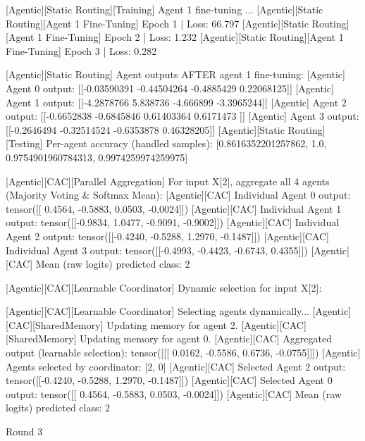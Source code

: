 [Agentic][Static Routing][Training] Agent 1 fine-tuning ...
[Agentic][Static Routing][Agent 1 Fine-Tuning] Epoch 1 | Loss: 66.797
[Agentic][Static Routing][Agent 1 Fine-Tuning] Epoch 2 | Loss: 1.232
[Agentic][Static Routing][Agent 1 Fine-Tuning] Epoch 3 | Loss: 0.282

[Agentic][Static Routing] Agent outputs AFTER agent 1 fine-tuning:
[Agentic] Agent 0 output: [[-0.03590391 -0.44504264 -0.4885429   0.22068125]]
[Agentic] Agent 1 output: [[-4.2878766  5.838736  -4.666899  -3.3965244]]
[Agentic] Agent 2 output: [[-0.6652838  -0.6845846   0.61403364  0.6171473 ]]
[Agentic] Agent 3 output: [[-0.2646494  -0.32514524 -0.6353878   0.46328205]]
[Agentic][Static Routing][Testing] Per-agent accuracy (handled samples): [0.8616352201257862, 1.0, 0.9754901960784313, 0.9974259974259975]

[Agentic][CAC][Parallel Aggregation] For input X[2], aggregate all 4 agents (Majority Voting & Softmax Mean):
[Agentic][CAC] Individual Agent 0 output: tensor([[ 0.4564, -0.5883,  0.0503, -0.0024]])
[Agentic][CAC] Individual Agent 1 output: tensor([[-0.9834,  1.0477, -0.9091, -0.9002]])
[Agentic][CAC] Individual Agent 2 output: tensor([[-0.4240, -0.5288,  1.2970, -0.1487]])
[Agentic][CAC] Individual Agent 3 output: tensor([[-0.4993, -0.4423, -0.6743,  0.4355]])
[Agentic][CAC] Mean (raw logits) predicted class: 2

[Agentic][CAC][Learnable Coordinator] Dynamic selection for input X[2]:

[Agentic][CAC][Learnable Coordinator] Selecting agents dynamically...
[Agentic][CAC][SharedMemory] Updating memory for agent 2.
[Agentic][CAC][SharedMemory] Updating memory for agent 0.
[Agentic][CAC] Aggregated output (learnable selection): tensor([[[ 0.0162, -0.5586,  0.6736, -0.0755]]])
[Agentic] Agents selected by coordinator: [2, 0]
[Agentic][CAC] Selected Agent 2 output: tensor([[-0.4240, -0.5288,  1.2970, -0.1487]])
[Agentic][CAC] Selected Agent 0 output: tensor([[ 0.4564, -0.5883,  0.0503, -0.0024]])
[Agentic][CAC] Mean (raw logits) predicted class: 2

Round 3

